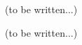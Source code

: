 \modHeadsection{\TBW}
(to be written...)







\modHeadsection{\TBW}
(to be written...)



\begin{appendices}
\end{appendices}

